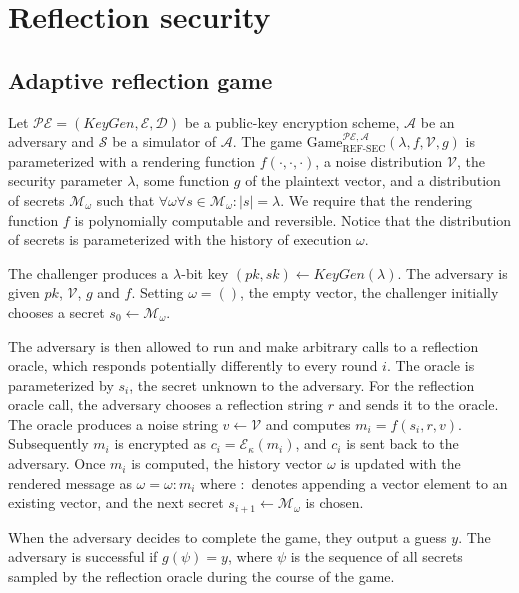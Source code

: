 \documentclass[conference, letterpaper, 10pt]{IEEEtran}
\begin{document}
\section{Reflection security}\label{sec:refsec}

\subsection{Adaptive reflection game}\label{subsec:refsecgame}

Let $\mathcal{PE} = (KeyGen, \mathcal{E}, \mathcal{D})$ be a public-key
encryption scheme, $\mathcal{A}$ be an adversary and $\mathcal{S}$ be a
simulator of $\mathcal{A}$.  The game
$\text{Game}_{\text{REF-SEC}}^{\mathcal{PE},\mathcal{A}}(\lambda,  f,
\mathcal{V}, g)$ is parameterized with a rendering function $f(\cdot, \cdot,
\cdot)$, a noise distribution $\mathcal{V}$, the security parameter $\lambda$,
some function $g$ of the plaintext vector, and a distribution of secrets $\mathcal{M}_\omega$
such that $\forall \omega \forall s \in \mathcal{M}_\omega: |s| = \lambda$. We
require that the rendering function $f$ is polynomially computable and
reversible.  Notice that the distribution of secrets is parameterized with the
history of execution $\omega$.

The challenger produces a $\lambda$-bit key $(pk, sk) \leftarrow
KeyGen(\lambda)$. The adversary is given $pk$, $\mathcal{V}$, $g$ and $f$.
Setting $\omega = ()$, the empty vector, the challenger initially chooses
a secret $s_0 \leftarrow \mathcal{M}_\omega$.

The adversary is then allowed to run and make arbitrary calls to a reflection
oracle, which responds potentially differently to every round $i$. The oracle
is parameterized by $s_i$, the secret unknown to the
adversary.  For the reflection oracle call, the adversary chooses a reflection
string $r$ and sends it to the oracle. The oracle produces a noise string
$v \leftarrow \mathcal{V}$ and computes $m_i = f(s_i, r, v)$. Subsequently
$m_i$ is encrypted as $c_i = \mathcal{E}_\kappa(m_i)$, and $c_i$ is sent back
to the adversary. Once $m_i$ is computed, the history vector $\omega$ is updated
with the rendered message as $\omega = \omega : m_i$ where $:$ denotes appending
a vector element to an existing vector, and the next secret $s_{i+1} \leftarrow \mathcal{M}_\omega$
is chosen.

When the adversary decides to complete the game, they output a guess $y$. The
adversary is successful if $g(\psi) = y$, where $\psi$ is the sequence
of all secrets sampled by the reflection oracle during the course of the game.
\end{document}
